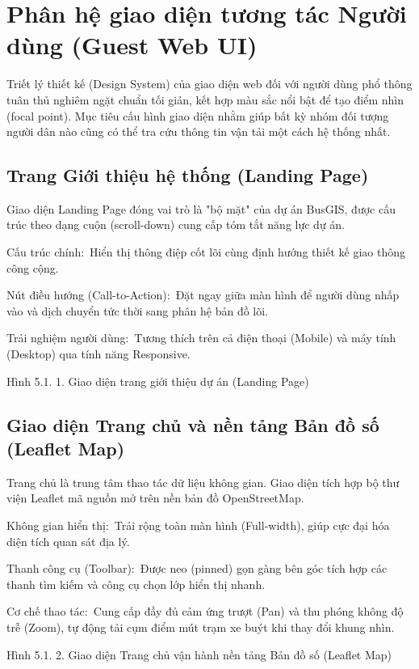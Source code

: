 \documentclass[13pt,a4paper]{report}
\begin{document}
\section{Phân hệ giao diện tương tác Người dùng (Guest Web UI)}

Triết lý thiết kế (Design System) của giao diện web đối với người dùng phổ thông tuân thủ nghiêm ngặt chuẩn tối giản, kết hợp màu sắc nổi bật để tạo điểm nhìn (focal point). Mục tiêu cấu hình giao diện nhằm giúp bất kỳ nhóm đối tượng người dân nào cũng có thể tra cứu thông tin vận tải một cách hệ thống nhất.

\subsection{Trang Giới thiệu hệ thống (Landing Page)}

Giao diện Landing Page đóng vai trò là "bộ mặt" của dự án BusGIS, được cấu trúc theo dạng cuộn (scroll-down) cung cấp tóm tắt năng lực dự án.

Cấu trúc chính: Hiển thị thông điệp cốt lõi cùng định hướng thiết kế giao thông công cộng.

Nút điều hướng (Call-to-Action): Đặt ngay giữa màn hình để người dùng nhấp vào và dịch chuyển tức thời sang phân hệ bản đồ lõi.

Trải nghiệm người dùng: Tương thích trên cả điện thoại (Mobile) và máy tính (Desktop) qua tính năng Responsive.

Hình 5.1. 1. Giao diện trang giới thiệu dự án (Landing Page)

\subsection{Giao diện Trang chủ và nền tảng Bản đồ số (Leaflet Map)}

Trang chủ là trung tâm thao tác dữ liệu không gian. Giao diện tích hợp bộ thư viện Leaflet mã nguồn mở trên nền bản đồ OpenStreetMap.

Không gian hiển thị: Trải rộng toàn màn hình (Full-width), giúp cực đại hóa diện tích quan sát địa lý.

Thanh công cụ (Toolbar): Được neo (pinned) gọn gàng bên góc tích hợp các thanh tìm kiếm và công cụ chọn lớp hiển thị nhanh.

Cơ chế thao tác: Cung cấp đầy đủ cảm ứng trượt (Pan) và thu phóng không độ trễ (Zoom), tự động tải cụm điểm mút trạm xe buýt khi thay đổi khung nhìn.

Hình 5.1. 2. Giao diện Trang chủ vận hành nền tảng Bản đồ số (Leaflet Map)
\end{document}
